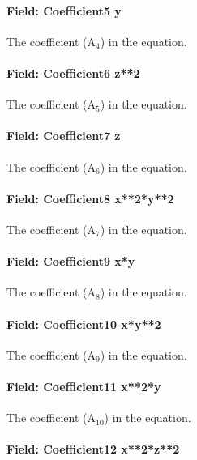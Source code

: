 \paragraph{Field: Coefficient5 y}\label{field-coefficient5-y-1}

The coefficient (A\(_{4}\)) in the equation.

\paragraph{Field: Coefficient6 z**2}\label{field-coefficient6-z2}

The coefficient (A\(_{5}\)) in the equation.

\paragraph{Field: Coefficient7 z}\label{field-coefficient7-z}

The coefficient (A\(_{6}\)) in the equation.

\paragraph{Field: Coefficient8 x**2*y**2}\label{field-coefficient8-x2y2}

The coefficient (A\(_{7}\)) in the equation.

\paragraph{Field: Coefficient9 x*y}\label{field-coefficient9-xy}

The coefficient (A\(_{8}\)) in the equation.

\paragraph{Field: Coefficient10 x*y**2}\label{field-coefficient10-xy2-1}

The coefficient (A\(_{9}\)) in the equation.

\paragraph{Field: Coefficient11 x**2*y}\label{field-coefficient11-x2y}

The coefficient (A\(_{10}\)) in the equation.

\paragraph{Field: Coefficient12 x**2*z**2}\label{field-coefficient12-x2z2}

